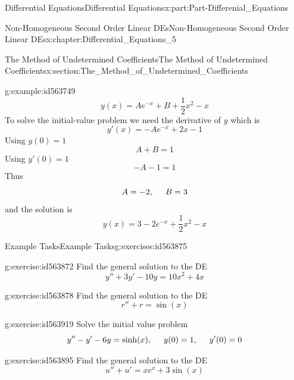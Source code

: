 \documentclass[oneside,10pt,]{book}
\numberwithin{equation}{section}
\begin{document}
\begin{partptx}{Differential Equations}{}{Differential Equations}{}{}{x:part:Part-Differenial_Equations}
\begin{chapterptx}{Non-Homogeneous Second Order Linear DEs}{}{Non-Homogeneous Second Order Linear DEs}{}{}{x:chapter:Differential_Equations_5}
\begin{sectionptx}{The Method of Undetermined Coefficients}{}{The Method of Undetermined Coefficients}{}{}{x:section:The_Method_of_Undetermined_Coefficients}
\begin{example}{}{g:example:id563749}
\begin{equation*}
y(x)=Ae^{-x}+B+\frac{1}{2}x^2-x
\end{equation*}
To solve the initial-value problem we need the derivative of \(y\) which is%
\begin{equation*}
y'(x)=-Ae^{-x}+2x-1
\end{equation*}
Using \(y(0)=1\)%
\begin{equation*}
A+B=1
\end{equation*}
Using \(y'(0)=1\)%
\begin{equation*}
-A-1=1
\end{equation*}
Thus%
\begin{equation*}
A=-2,\hspace{5mm} B=3
\end{equation*}
and the solution is%
\begin{equation*}
y(x)=3-2e^{-x}+\frac{1}{2}x^2-x
\end{equation*}
%
\end{example}
%
%
\typeout{************************************************}
\typeout{************************************************}
%
\begin{exercises-subsection-numberless}{Example Tasks}{}{Example Tasks}{}{}{g:exercises:id563875}
\begin{divisionexercise}{1}{}{}{g:exercise:id563872}%
Find the general solution to the DE%
\begin{equation*}
y''+3y'-10y=10x^2+4x
\end{equation*}
%
\end{divisionexercise}%
\begin{divisionexercise}{2}{}{}{g:exercise:id563878}%
Find the general solution to the DE%
\begin{equation*}
r''+r=\sin(x)
\end{equation*}
%
\end{divisionexercise}%
\begin{divisionexercise}{3}{}{}{g:exercise:id563919}%
Solve the initial value problem%
\begin{equation*}
y''-y'-6y=\sinh(x),\hspace{5mm}y(0)=1,\hspace{5mm}y'(0)=0
\end{equation*}
%
\end{divisionexercise}%
\begin{divisionexercise}{4}{}{}{g:exercise:id563895}%
Find the general solution to the DE%
\begin{equation*}
u''+u'=xe^x+3\sin(x)
\end{equation*}

\end{divisionexercise}
\end{exercises-subsection-numberless}
\end{sectionptx}
\end{chapterptx}
\end{partptx}
\end{document}
